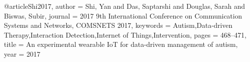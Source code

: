 @article{Shi2017,
author = {Shi, Yan and Das, Saptarshi and Douglas, Sarah and Biswas, Subir},
journal = {2017 9th International Conference on Communication Systems and Networks, COMSNETS 2017},
keywords = {Autism,Data-driven Therapy,Interaction Detection,Internet of Things,Intervention},
pages = {468--471},
title = {{An experimental wearable IoT for data-driven management of autism}},
year = {2017}
}
